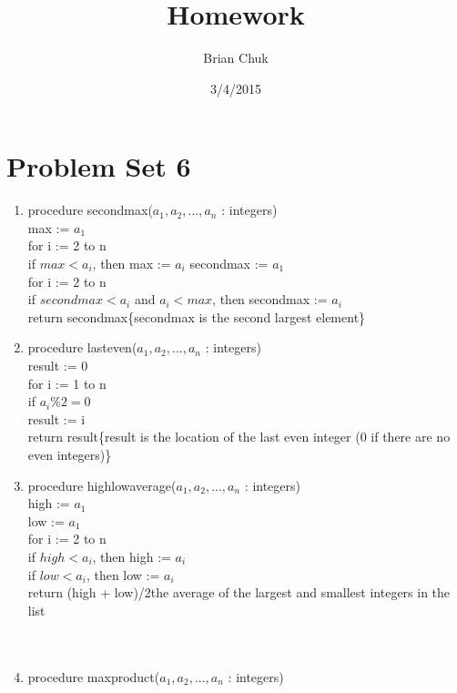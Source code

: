 \documentclass[11pt]{article}
\title{\textbf{Homework}}
\author{Brian Chuk}
\date{3/4/2015}
\begin{document}
\maketitle

\section{Problem Set 6}
\begin{enumerate}
\item procedure secondmax($a_1 , a_2 , . . . , a_n$ : integers)
	\\max := $a_1$
	\\for i := 2 to n
	\\ \hspace*{20 pt}if $max <a_i$, then max := $a_i$
	secondmax := $a_1$
	\\for i := 2 to n
	\\ \hspace*{20 pt}if $secondmax < a_i$ and $a_i < max$, then secondmax := $a_i$
	\\return secondmax\{secondmax is the second largest element\}
\item procedure lasteven($a_1 , a_2 , . . . , a_n$ : integers)
	\\result := 0
	\\for i := 1 to n
	\\ \hspace*{20 pt}if $a_i \% 2 = 0$
	\\ \hspace*{40 pt}result := i
	\\return result\{result is the location of the last even integer (0 if there are no even integers)\}
\item procedure highlowaverage($a_1 , a_2 , . . . , a_n$ : integers)
	\\high := $a_1$
	\\low := $a_1$
	\\for i := 2 to n
	\\\hspace*{20 pt}if $high <a_i$, then high := $a_i$
	\\\hspace*{20 pt}if $low <a_i$, then low := $a_i$
	\\return (high + low)/2{the average of the largest and smallest integers in the list}\\\\\\
\item procedure maxproduct($a_1 , a_2 , . . . , a_n$ : integers)

\end{enumerate}
\end{document}
